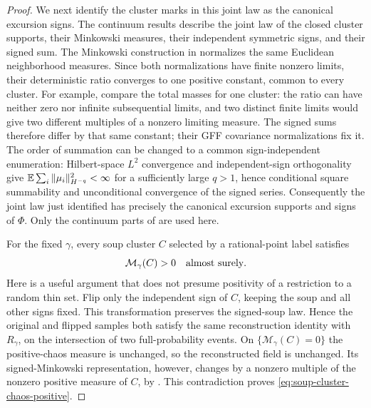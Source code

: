 \begin{proof}
We next identify the cluster marks in this joint law as the canonical
excursion signs.  The continuum results
\cite[Theorems~1 and~2]{ALS2023} describe the joint law of the closed
cluster supports, their Minkowski measures, their independent symmetric
signs, and their signed sum.  The Minkowski construction in
\cite[Theorems~1.9 and~1.10]{JLQ2023Fields} normalizes the same
Euclidean neighborhood measures.  Since both normalizations have
finite nonzero limits, their deterministic ratio converges to one
positive constant, common to every cluster.  For example, compare
the total masses for one cluster: the ratio can have neither zero
nor infinite subsequential limits, and two distinct finite limits
would give two different multiples of a nonzero limiting measure.
The signed sums therefore differ by that same constant; their GFF
covariance normalizations fix it.  The order of summation can be
changed to a common sign-independent enumeration: Hilbert-space
\(L^2\) convergence and independent-sign orthogonality give
\(\mathbb E\sum_i\|\mu_i\|_{H^{-q}}^2<\infty\) for a sufficiently large
\(q>1\), hence conditional square summability and unconditional
convergence of the signed series.  Consequently the joint law just
identified has precisely the canonical excursion supports and signs
of \(\Phi\).  Only the continuum parts of \cite{ALS2023} are used here.

For the fixed \(\gamma\), every soup cluster \(C\) selected by a
rational-point label satisfies
\begin{equation}
                       \mathcal M_\gamma(C)>0
                       \quad\hbox{almost surely}.
 \label{eq:soup-cluster-chaos-positive}
\end{equation}
Here is a useful argument that does not presume positivity of a
restriction to a random thin set.  Flip only the independent sign of
\(C\), keeping the soup and all other signs fixed.  This transformation
preserves the signed-soup law.  Hence the original and flipped samples
both satisfy the same reconstruction identity with \(R_\gamma\), on
the intersection of two full-probability events.  On
\(\{\mathcal M_\gamma(C)=0\}\) the positive-chaos measure is unchanged,
so the reconstructed field is unchanged.  Its signed-Minkowski
representation, however, changes by a nonzero multiple of the
nonzero positive measure of \(C\), by
\cite[Theorems~1.4, 1.9 and~1.10]{JLQ2023Fields}.  This contradiction
proves \eqref{eq:soup-cluster-chaos-positive}.


\end{proof}
